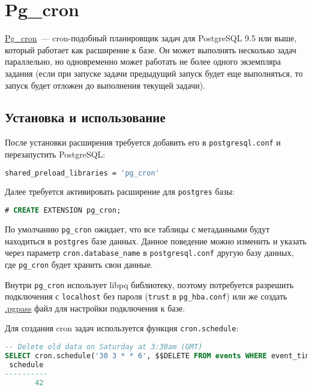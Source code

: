 \section{Pg\_cron}

\href{https://github.com/citusdata/pg\_cron}{Pg\_cron}~--- cron-подобный планировщик задач для PostgreSQL 9.5 или выше, который работает как расширение к базе. Он может выполнять несколько задач параллельно, но одновременно может работать не более одного экземпляра задания (если при запуске задачи предыдущий запуск будет еще выполняться, то запуск будет отложен до выполнения текущей задачи).

\subsection{Установка и использование}

После установки расширения требуется добавить его в \lstinline!postgresql.conf! и перезапустить PostgreSQL:

\begin{lstlisting}[language=Bash,label=lst:pgcron1,caption=pg\_cron]
shared_preload_libraries = 'pg_cron'
\end{lstlisting}

Далее требуется активировать расширение для \lstinline!postgres! базы:

\begin{lstlisting}[language=SQL,label=lst:pgcron2,caption=pg\_cron]
# CREATE EXTENSION pg_cron;
\end{lstlisting}

По умолчанию \lstinline!pg_cron! ожидает, что все таблицы с метаданными будут находиться в \lstinline!postgres! базе данных. Данное поведение можно изменить и указать через параметр \lstinline!cron.database_name! в \lstinline!postgresql.conf! другую базу данных, где \lstinline!pg_cron! будет хранить свои данные.

Внутри \lstinline!pg_cron! использует libpq библиотеку, поэтому потребуется разрешить подключения с \lstinline!localhost! без пароля (\lstinline!trust! в \lstinline!pg_hba.conf!) или же создать \href{https://www.postgresql.org/docs/current/static/libpq-pgpass.html}{.pgpass} файл для настройки подключения к базе.

Для создания cron задач используется функция \lstinline!cron.schedule!:

\begin{lstlisting}[language=SQL,label=lst:pgcron3,caption=Cron.schedule]
-- Delete old data on Saturday at 3:30am (GMT)
SELECT cron.schedule('30 3 * * 6', $$DELETE FROM events WHERE event_time < now() - interval '1 week'$$);
 schedule
----------
       42
\end{lstlisting}

